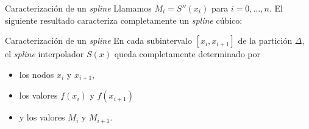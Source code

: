 \begin{frame}{Caracterización de un \textit{spline}}
  Llamamos $M_i = S''(x_i)$ para $i = 0, \dots, n$. El siguiente resultado
  caracteriza completamente un \textit{spline} cúbico:

  \begin{exampleblock}{Caracterización de un \textit{spline}}
    En cada subintervalo $[x_i, x_{i + 1}]$ de la partición $\Delta$, el
    \textit{spline} interpolador $S(x)$ queda completamente determinado por
    \begin{itemize}
      \item los nodos $x_i$ y $x_{i + 1}$,
      \item los valores $f(x_i)$ y $f(x_{i + 1})$
      \item y los valores $M_i$ y $M_{i + 1}$.
    \end{itemize}
  \end{exampleblock}
\end{frame}
